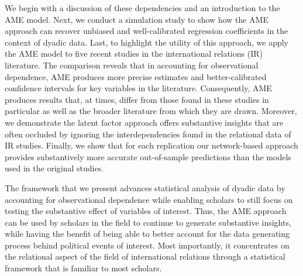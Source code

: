We begin with a discussion of these dependencies and an introduction to the AME model. Next, we conduct a simulation study to show how the AME approach can recover unbiased and well-calibrated regression coefficients in the context of dyadic data. Last, to highlight the utility of this approach, we apply the AME model to five recent studies in the international relations (IR) literature. The comparison reveals that in accounting for observational dependence, AME produces more precise estimates and better-calibrated confidence intervals for key variables in the literature. Consequently, AME produces results that, at times, differ from those found in these studies in particular as well as the broader literature from which they are drawn. Moreover, we demonstrate the latent factor approach offers substantive insights that are often occluded by ignoring the interdependencies found in the relational data of IR studies. Finally, we show that for each replication our network-based approach provides substantively more accurate out-of-sample predictions than the models used in the original studies. 

The framework that we present advances statistical analysis of dyadic data by accounting for observational dependence while enabling scholars to still focus on testing the substantive effect of variables of interest. Thus, the AME approach can be used by scholars in the field to continue to generate substantive insights, while having the benefit of being able to better account for the data generating process behind political events of interest. Most importantly, it concentrates on the relational aspect of the field of international relations through a statistical framework that is familiar to most scholars.